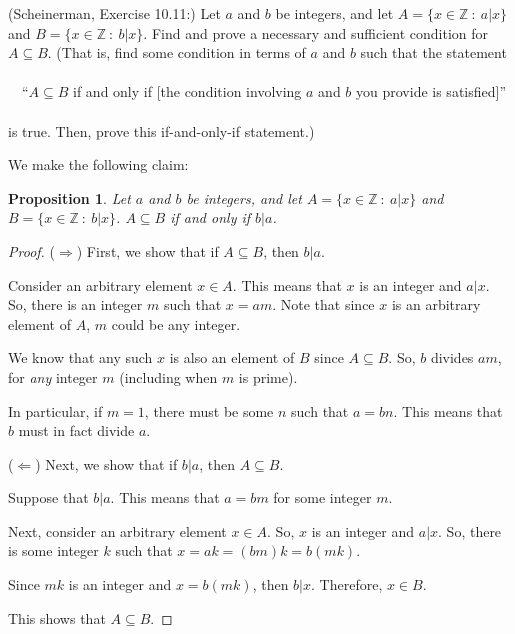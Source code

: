 \documentclass{article}
\newcommand{\Z}{\mathbb{Z}}
\newtheorem*{proposition}{Proposition}
\theoremstyle{definition}
\begin{document}
\begin{question}
   (Scheinerman, Exercise 10.11:)
   Let $a$ and $b$ be integers, and let $A = \{x \in \Z ~:~ a|x\}$ and $B = \{ x\in\Z ~:~ b|x\}$.  
   Find and prove a necessary and sufficient condition for $A \subseteq B$.
   (That is, find some condition in terms of $a$ and $b$ such that the statement\\~\\
   $~~~$ ``$A \subseteq B$ if and only if [the condition involving $a$ and $b$ you provide is satisfied]''\\~\\
   is true.  Then, prove this if-and-only-if statement.)
\end{question}
\begin{solution}
We make the following claim:
\begin{proposition}
Let $a$ and $b$ be integers, and let $A = \{x \in \Z ~:~ a|x\}$ and $B = \{ x\in\Z ~:~ b|x\}$.  
$A \subseteq B$ if and only if $b|a$.
\end{proposition}
\begin{proof}
($\Rightarrow$) First, we show that if $A\subseteq B$, then $b|a$.

Consider an arbitrary element $x \in A$.  This means that $x$ is an integer and $a|x$.  So, there is an integer $m$ such that $x = am$.  Note that since $x$ is an arbitrary element of $A$, $m$ could be any integer.

We know that any such $x$ is also an element of $B$ since $A \subseteq B$.  So, $b$ divides $am$, for \emph{any} integer $m$ (including when $m$ is prime).

In particular, if $m = 1$, there must be some $n$ such that $a = bn$.  This means that $b$ must in fact divide $a$.

($\Leftarrow$) Next, we show that if $b|a$, then $A\subseteq B$.

Suppose that $b |a$.  This means that $a = bm$ for some integer $m$.

Next, consider an arbitrary element $x \in A$.  So, $x$ is an integer and $a|x$.  So, there is some integer $k$ such that $x = ak = (bm)k = b(mk)$.

Since $mk$ is an integer and $x = b(mk)$, then $b|x$.  Therefore, $x \in B$.

This shows that $A \subseteq B$.
\end{proof}
\end{solution}
\end{document}
